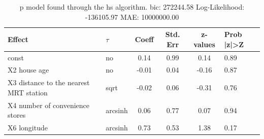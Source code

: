 \begin{table}
	\caption{p model found through the hs algorithm. bic: 272244.58 Log-Likelihood: -136105.97 MAE: 10000000.00}
	\begin{center}
		\begin{tabular}{|l|l|c|c|c|l|}
			\hline
			Effect & $\tau$ & Coeff & Std. Err & z-values & Prob |z|>Z \\
			\hline
			const & no & 0.14 & 0.99 & 0.14 & 0.89 \\
			\hline
			X2 house age & no & -0.01 & 0.04 & -0.16 & 0.87 \\
			\hline
			X3 distance to the nearest MRT station & sqrt & -0.02 & 0.06 & -0.31 & 0.76 \\
			\hline
			X4 number of convenience stores & arcsinh & 0.06 & 0.77 & 0.07 & 0.94 \\
			\hline
			X6 longitude & arcsinh & 0.73 & 0.53 & 1.38 & 0.17 \\
			\hline
		\end{tabular}
	\end{center}
\end{table}